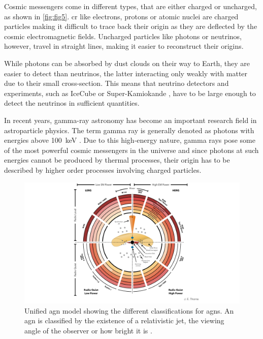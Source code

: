 Cosmic messengers come in different types, that are either charged or uncharged, as shown in \autoref{fig:fig5}.
\gls{cr} like electrons, protons or atomic nuclei are charged particles making it difficult to trace back their origin
as they are deflected by the cosmic electromagnetic fields. Uncharged particles like photons or
neutrinos, however, travel in straight lines, making it easier to reconstruct their origins.

While photons can be absorbed by dust clouds on their way to Earth, they are easier to detect than
neutrinos, the latter interacting only weakly with matter due to their small cross-section.
This means that neutrino detectors and experiments, such as IceCube \cite{icecube_2006} or
Super-Kamiokande \cite{kamiokande}, have to be large enough to detect the neutrinos in sufficient quantities.

In recent years, gamma-ray astronomy has become an important research field in astroparticle physics.
The term gamma ray is generally denoted as photons with energies above \SI{100}{\kilo\eV}
\cite{funk}. Due to this high-energy nature, gamma rays pose some of the most powerful cosmic messengers in
the universe and since photons at such energies cannot be produced by thermal processes, their origin
has to be described by higher order processes involving charged particles.

\begin{figure}
    \centering
    \includegraphics[width=\textwidth]{graphics/agn.pdf}
    \caption{Unified \gls{agn} model showing the different classifications for \glspl{agn}.
    An \gls{agn} is classified by the existence of a relativistic jet, the viewing angle of the observer
    or how bright it is \cite{agn_diagram}.}
    \label{fig:agn}
\end{figure}


